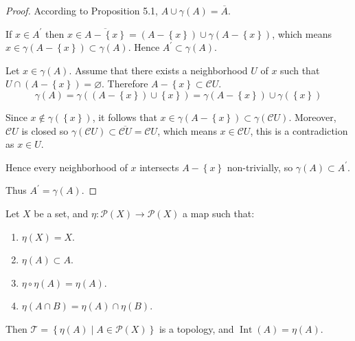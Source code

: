 \begin{proof}
	According to Proposition 5.1, \( A \cup \gamma(A) = \overline{A} \).

	If \( x \in A^{\prime} \) then \( x \in \overline{A - \left\{x\right\}} = (A - \left\{x\right\}) \cup \gamma(A - \left\{x\right\}) \), which means \( x \in \gamma(A - \left\{x\right\}) \subset \gamma(A) \). Hence \( A^{\prime} \subset \gamma(A) \).

	Let \( x \in \gamma(A) \). Assume that there exists a neighborhood \(U\) of \(x\) such that \( U \cap (A - \left\{x\right\}) = \varnothing \). Therefore \( A - \left\{x\right\} \subset \mathscr{C}U \).
	\[
		\gamma(A) = \gamma((A - \left\{x\right\}) \cup \left\{x\right\}) = \gamma(A - \left\{x\right\}) \cup \gamma(\left\{x\right\})
	\]

	Since \( x \notin \gamma(\left\{x\right\}) \), it follows that \( x \in \gamma(A - \left\{ x \right\}) \subset \gamma(\mathscr{C}U) \). Moreover, \( \mathscr{C}U \) is closed so \( \gamma(\mathscr{C}U) \subset \overline{\mathscr{C}U} = \mathscr{C}U \), which means \( x \in \mathscr{C}U \), this is a contradiction as \( x \in U \).

	Hence every neighborhood of \(x\) intersects \( A - \left\{x\right\} \) non-trivially, so \( \gamma(A) \subset A^{\prime} \).

	Thus \( A^{\prime} = \gamma(A) \).
\end{proof}

\begin{proposition}{5.3}
	Let \(X\) be a set, and \( \eta: \mathscr{P}(X) \to \mathscr{P}(X) \) a map such that:
	\begin{enumerate}[label={(\arabic*)}]
		\item \( \eta(X) = X \).
		\item \( \eta(A) \subset A \).
		\item \( \eta \circ \eta(A) = \eta(A) \).
		\item \( \eta(A \cap B) = \eta(A) \cap \eta(B) \).
	\end{enumerate}

	Then \( \mathscr{T} = \left\{ \eta(A) \mid A \in \mathscr{P}(X) \right\} \) is a topology, and \( \operatorname{Int}(A) = \eta(A) \).
\end{proposition}

